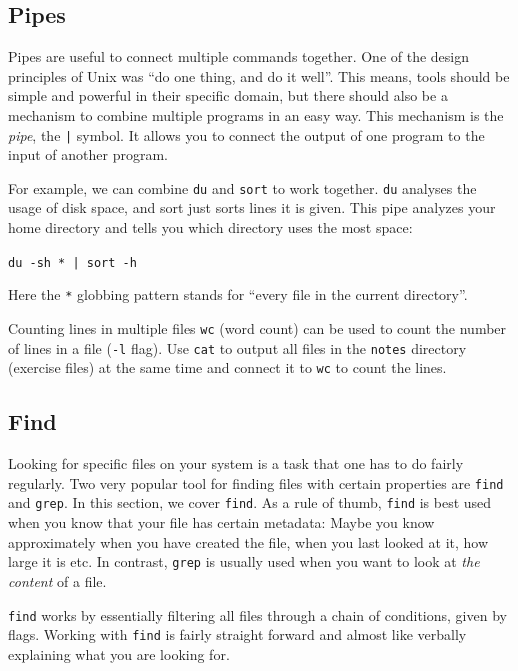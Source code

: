 \documentclass{TheAlternativeCourse}
\begin{document}
\subsection{Pipes}

Pipes are useful to connect multiple commands together. One of the design
principles of Unix was ``do one thing, and do it well''. This means, tools
should be simple and powerful in their specific domain, but there should also
be a mechanism to combine multiple programs in an easy way. This mechanism is
the \emph{pipe}, the \texttt{|} symbol. It allows you to connect the output of
one program to the input of another program.

For example, we can combine \texttt{du} and \texttt{sort} to work together.
\texttt{du} analyses the usage of disk space, and sort just sorts lines
it is given. This pipe analyzes your home directory and tells you which
directory uses the most space:

\begin{cmdbox}
    \texttt{du -sh * | sort -h}
\end{cmdbox}

Here the \texttt{*} globbing pattern stands for ``every file in the current
directory''.

\begin{exercisebox}{Counting lines in multiple files}
    \texttt{wc} (word count) can be used to count the number of lines in a file
    (\texttt{-l} flag). Use \texttt{cat} to output all files in the
    \texttt{notes} directory (exercise files) at the same time and connect it
    to \texttt{wc} to count the lines.
\end{exercisebox}

\subsection{Find}

Looking for specific files on your system is a task that one has to do fairly
regularly. Two very popular tool for finding files with certain properties are
\texttt{find} and \texttt{grep}. In this section, we cover \texttt{find}.  As a
rule of thumb, \texttt{find} is best used when you know that your file has
certain metadata: Maybe you know approximately when you have created the file,
when you last looked at it, how large it is etc. In contrast, \texttt{grep} is
usually used when you want to look at \emph{the content} of a file.

\texttt{find} works by essentially filtering all files through a chain of
conditions, given by flags. Working with \texttt{find} is
fairly straight forward and almost like verbally explaining what you are
looking for.
\end{document}
